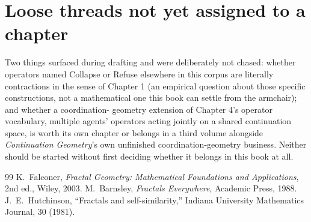 \documentclass[11pt]{report}
\begin{document}
\section*{Loose threads not yet assigned to a chapter}
Two things surfaced during drafting and were deliberately not chased:
whether operators named Collapse or Refuse elsewhere in this corpus
are literally contractions in the sense of Chapter 1 (an empirical
question about those specific constructions, not a mathematical one
this book can settle from the armchair); and whether a coordination-
geometry extension of Chapter 4's operator vocabulary, multiple
agents' operators acting jointly on a shared continuation space, is
worth its own chapter or belongs in a third volume alongside
\emph{Continuation Geometry}'s own unfinished coordination-geometry
business. Neither should be started without first deciding whether it
belongs in this book at all.

\newpage
{}

\begin{thebibliography}{99}
K.\ Falconer, \emph{Fractal Geometry:
Mathematical Foundations and Applications}, 2nd ed., Wiley, 2003.
M.\ Barnsley, \emph{Fractals Everywhere},
Academic Press, 1988.
J.\ E.\ Hutchinson, ``Fractals and
self-similarity,'' Indiana University Mathematics Journal, 30 (1981).
\end{thebibliography}
\end{document}
